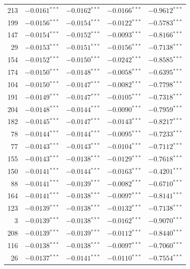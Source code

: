 \documentclass[review,authoryear]{elsarticle}
\begin{document}
\begin{longtable}{rrrrr}
213 & $-0.0161$$^{***}$ & $-0.0162$$^{***}$ & $-0.0166$$^{***}$ & $-0.9612$$^{***}$ \\
199 & $-0.0156$$^{***}$ & $-0.0154$$^{***}$ & $-0.0122$$^{***}$ & $-0.5783$$^{***}$ \\
147 & $-0.0154$$^{***}$ & $-0.0152$$^{***}$ & $-0.0093$$^{***}$ & $-0.8166$$^{***}$ \\
29 & $-0.0153$$^{***}$ & $-0.0151$$^{***}$ & $-0.0156$$^{***}$ & $-0.7138$$^{***}$ \\
154 & $-0.0152$$^{***}$ & $-0.0150$$^{***}$ & $-0.0242$$^{***}$ & $-0.8585$$^{***}$ \\
174 & $-0.0150$$^{***}$ & $-0.0148$$^{***}$ & $-0.0058$$^{***}$ & $-0.6395$$^{***}$ \\
104 & $-0.0150$$^{***}$ & $-0.0147$$^{***}$ & $-0.0082$$^{***}$ & $-0.7798$$^{***}$ \\
191 & $-0.0149$$^{***}$ & $-0.0147$$^{***}$ & $-0.0105$$^{***}$ & $-0.7318$$^{***}$ \\
204 & $-0.0148$$^{***}$ & $-0.0144$$^{***}$ & $-0.0090$$^{***}$ & $-0.7959$$^{***}$ \\
182 & $-0.0145$$^{***}$ & $-0.0147$$^{***}$ & $-0.0143$$^{***}$ & $-0.8217$$^{***}$ \\
78 & $-0.0144$$^{***}$ & $-0.0144$$^{***}$ & $-0.0095$$^{***}$ & $-0.7233$$^{***}$ \\
77 & $-0.0143$$^{***}$ & $-0.0143$$^{***}$ & $-0.0104$$^{***}$ & $-0.7112$$^{***}$ \\
155 & $-0.0143$$^{***}$ & $-0.0138$$^{***}$ & $-0.0129$$^{***}$ & $-0.7618$$^{***}$ \\
150 & $-0.0141$$^{***}$ & $-0.0144$$^{***}$ & $-0.0163$$^{***}$ & $-0.4201$$^{***}$ \\
88 & $-0.0141$$^{***}$ & $-0.0139$$^{***}$ & $-0.0082$$^{***}$ & $-0.6710$$^{***}$ \\
164 & $-0.0141$$^{***}$ & $-0.0138$$^{***}$ & $-0.0097$$^{***}$ & $-0.8141$$^{***}$ \\
123 & $-0.0139$$^{***}$ & $-0.0138$$^{***}$ & $-0.0132$$^{***}$ & $-0.7138$$^{***}$ \\
3 & $-0.0139$$^{***}$ & $-0.0138$$^{***}$ & $-0.0162$$^{***}$ & $-0.9070$$^{***}$ \\
208 & $-0.0139$$^{***}$ & $-0.0139$$^{***}$ & $-0.0112$$^{***}$ & $-0.8440$$^{***}$ \\
116 & $-0.0138$$^{***}$ & $-0.0138$$^{***}$ & $-0.0097$$^{***}$ & $-0.7060$$^{***}$ \\
26 & $-0.0137$$^{***}$ & $-0.0141$$^{***}$ & $-0.0110$$^{***}$ & $-0.7554$$^{***}$ \\

\end{longtable}
\end{document}

